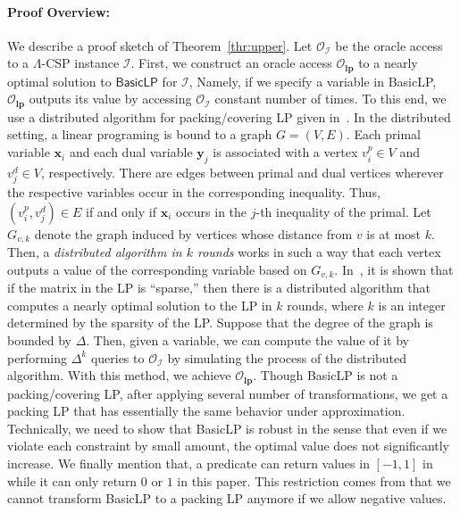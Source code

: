 \documentclass[letterpaper, 11pt]{article}
\newcommand{\calI}{\mathcal{I}}
\newcommand{\calO}{\mathcal{O}}
\newcommand{\bix}{\boldsymbol{x}}
\newcommand{\biy}{\boldsymbol{y}}
\newcommand{\blp}{\textsf{BasicLP}\xspace}
\newcommand{\lp}{\mathbf{lp}}
\begin{document}
\paragraph{Proof Overview:}
We describe a proof sketch of Theorem~\ref{thr:upper}.
Let $\calO_\calI$ be the oracle access to a $\Lambda$-CSP instance $\calI$.
First, 
we construct an oracle access $\calO_{\lp}$ to a nearly optimal solution to $\blp$ for $\calI$,
Namely, 
if we specify a variable in \blp, 
$\calO_{\lp}$ outputs its value by accessing $\calO_{\calI}$ constant number of times.
To this end, we use a distributed algorithm for packing/covering LP given in~\cite{KMW06}.
In the distributed setting,
a linear programing is bound to a graph $G=(V,E)$.
Each primal variable $\bix_i$ and each dual variable $\biy_j$ is associated with a vertex $v_i^p\in V$ and $v_j^d\in V$, respectively. 
There are edges between primal and dual vertices wherever the respective variables occur in the corresponding inequality.
Thus, $(v_i^p, v_j^d)\in E$ if and only if $\bix_i$ occurs in the $j$-th inequality of the primal.
Let $G_{v,k}$ denote the graph induced by vertices whose distance from $v$ is at most $k$.
Then, a \textit{distributed algorithm in $k$ rounds} works in such a way that each vertex outputs a value of the corresponding variable based on $G_{v,k}$.
In~\cite{KMW06},
it is shown that if the matrix in the LP is ``sparse,''
then there is a distributed algorithm that computes a nearly optimal solution to the LP in $k$ rounds,
where $k$ is an integer determined by the sparsity of the LP.
Suppose that the degree of the graph is bounded by $\Delta$.
Then, given a variable,
we can compute the value of it by performing $\Delta^k$ queries to $\calO_{\calI}$ by simulating the process of the distributed algorithm.
With this method, we achieve $\calO_{\lp}$.
Though \blp is not a packing/covering LP,
after applying several number of transformations,
we get a packing LP that has essentially the same behavior under approximation.
Technically, we need to show that \blp is robust in the sense that
even if we violate each constraint by small amount,
the optimal value does not significantly increase.
We finally mention that, a predicate can return values in $[-1,1]$ in \cite{Rag08} while it can only return $0$ or $1$ in this paper.
This restriction comes from that we cannot transform \blp to a packing LP anymore if we allow negative values.
\end{document}
